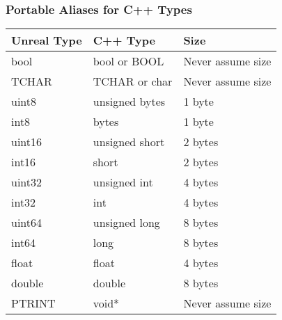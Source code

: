 \begin{frame}
  \frametitle{Portable Aliases for C++ Types}
  \begin{table}
      \begin{tabular}{ | l | l | l | }
        \hline
        \textbf{Unreal Type} & \textbf{C++ Type} & \textbf{Size} \\
        \hline
        bool & bool or BOOL & Never assume size \\
        \hline
        TCHAR & TCHAR or char & Never assume size \\
        \hline
        uint8 & unsigned bytes & 1 byte \\
        \hline
        int8 & bytes & 1 byte \\
        \hline
        uint16 & unsigned short & 2 bytes \\
        \hline
        int16 & short & 2 bytes \\
        \hline
        uint32 & unsigned int & 4 bytes \\
        \hline
        int32 & int & 4 bytes \\
        \hline
        uint64 & unsigned long & 8 bytes \\
        \hline
        int64 & long & 8 bytes \\
        \hline
        float & float & 4 bytes \\
        \hline
        double & double & 8 bytes \\
        \hline
        PTRINT & void* & Never assume size \\
        \hline
      \end{tabular}
    \end{table}
\end{frame}

